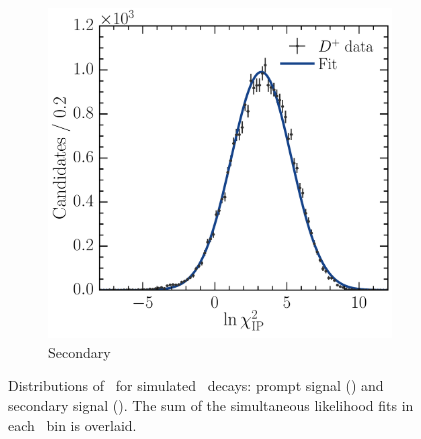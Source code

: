 \begin{figure}
\begin{subfigure}[b]{0.5\textwidth}
    \includegraphics[width=\textwidth]{figures/production/fitting/DpToKpipi_ipchisq_fit_pT_integrated_y_integrated_sec}
    \caption{Secondary}
    \label{fig:prod:fitting:prefits:DpToKpipi:secondary}
  \end{subfigure}
  \caption{%
    Distributions of \lnipchisq\ for simulated \DpToKpipi\ decays: prompt 
    signal \PDplus () and 
    secondary signal \PDplus 
    ().
    The sum of the simultaneous likelihood fits in each \pTy\ bin is overlaid.
  }
  \label{fig:prod:fitting:prefits:DpToKpipi}
\end{figure}

